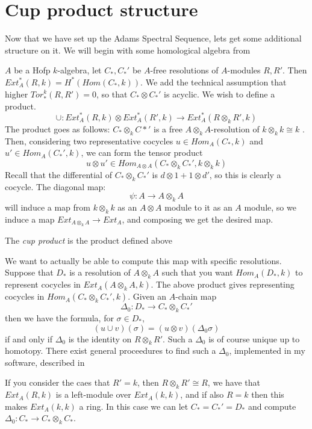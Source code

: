 


\section{Cup product structure}

Now that we have set up the Adams Spectral Sequence, lets get some additional structure on it.  
We will begin with some homological algebra from \cite[Chapter XI]{ElienCart}

$A$ be a Hofp $k$-algebra, let $C_*,C_* '$ be $A$-free resolutions of $A$-modules $R, R'$.
Then $Ext_A^*(R,k)=H^*(Hom(C_*,k))$.  
We add the technical assumption that higher $Tor_*^k(R,R')=0$, so that $C_*\otimes C_*'$ is acyclic.  
We wish to define a product.
\[\cup : Ext^*_A(R,k)\otimes Ext^*_A(R',k)\to Ext^*_A(R\otimes_k R',k)\]
The product goes as follows: $C_*\otimes_k C*'$ is a free $A\otimes_k A$-resolution of $k\otimes_k k \cong k$ \cite[XI Prop 1.1]{ElienCart}.  
Then, considering two representative cocycles $u\in Hom_A(C_*,k)$ and $u'\in Hom_A(C_*',k)$, we can form the tensor product 
\[u\otimes u' \in Hom_{A\otimes A}(C_*\otimes_k C_*',k\otimes_k k)\]
Recall that the differential of $C_*\otimes_k C_*'$ is $d\otimes 1 + 1\otimes d'$, so this is clearly a cocycle.  
The diagonal map:
\[\psi : A\to A\otimes_k A\]
will induce a map from $k \otimes_k k$ as an $A\otimes A$ module to it as an $A$ module, so we induce a map $Ext_{A\otimes_k A}\to Ext_A$, and composing we get the desired map.  

\begin{mydef}
The \emph{cup product} is the product defined above
\end{mydef}

We want to actually be able to compute this map with specific resolutions.  Suppose that $D_*$ is a resolution of $A\otimes_k A$ such that you want $Hom_A(D_*,k)$ to represent cocycles in $Ext_A(A\otimes_k A,k)$.  
The above product gives representing cocycles in $Hom_A(C_*\otimes_k C_*',k)$. 
Given an $A$-chain map 
\[\Delta_0:D_*\to C_*\otimes_k C_*'\]
then we have the formula, for $\sigma \in D_*$,
\[(u\cup v)(\sigma) = (u\otimes v)(\Delta_0 \sigma)\]
if and only if $\Delta_0$ is the identity on $R\otimes_k R'$.  Such a $\Delta_0$ is of course unique up to homotopy.
There exist general proceedures to find such a $\Delta_0$, implemented in my software, described in \cite[XI Prop 5.2]{ElienCart}



If you consider the caes that $R'=k$, then $R\otimes_k R'\cong R$, we have that $Ext_A(R,k)$ is a left-module over $Ext_A(k,k)$, and
if also $R=k$ then this makes $Ext_A(k,k)$ a ring.  In this case we can let $C_*=C_*'=D_*$ and compute $\Delta_0:C_*\to C_*\otimes_k C_*$.  



